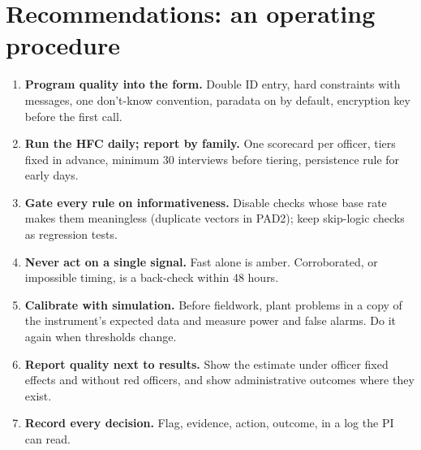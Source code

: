 \documentclass[11pt,a4paper]{article}
\begin{document}
\section{Recommendations: an operating procedure}\label{sec:recs}
\begin{enumerate}
\item \textbf{Program quality into the form.} Double ID entry, hard constraints with messages, one don't-know convention, paradata on by default, encryption key before the first call.
\item \textbf{Run the HFC daily; report by family.} One scorecard per officer, tiers fixed in advance, minimum 30 interviews before tiering, persistence rule for early days.
\item \textbf{Gate every rule on informativeness.} Disable checks whose base rate makes them meaningless (duplicate vectors in PAD2); keep skip-logic checks as regression tests.
\item \textbf{Never act on a single signal.} Fast alone is amber. Corroborated, or impossible timing, is a back-check within 48 hours.
\item \textbf{Calibrate with simulation.} Before fieldwork, plant problems in a copy of the instrument's expected data and measure power and false alarms. Do it again when thresholds change.
\item \textbf{Report quality next to results.} Show the estimate under officer fixed effects and without red officers, and show administrative outcomes where they exist.
\item \textbf{Record every decision.} Flag, evidence, action, outcome, in a log the PI can read.
\end{enumerate}
\end{document}
